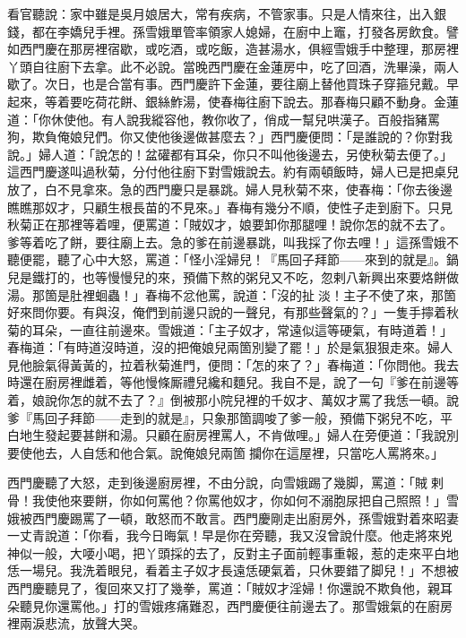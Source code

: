 看官聽說：家中雖是吳月娘居大，常有疾病，不管家事。只是人情來往，出入銀錢，都在李嬌兒手裡。孫雪娥單管率領家人媳婦，在廚中上竈，打發各房飲食。譬如西門慶在那房裡宿歇，或吃酒，或吃飯，造甚湯水，俱經雪娥手中整理，那房裡丫頭自往廚下去拿。此不必說。當晚西門慶在金蓮房中，吃了回酒，洗畢澡，兩人歇了。次日，也是合當有事。西門慶許下金蓮，要往廟上替他買珠子穿箍兒戴。早起來，等着要吃荷花餅、銀絲鮓湯，{}使春梅往廚下說去。那春梅只顧不動身。金蓮道：「你休使他。{}有人說我縱容他，教你收了，俏成一幫兒哄漢子。百般指豬罵狗，欺負俺娘兒們。你又使他後邊做甚麼去？」西門慶便問：「是誰說的？你對我說。」婦人道：「說怎的！盆礶都有耳朵，{}你只不叫他後邊去，另使秋菊去便了。」這西門慶遂叫過秋菊，分付他往廚下對雪娥說去。約有兩頓飯時，婦人已是把桌兒放了，{}白不見拿來。急的西門慶只是暴跳。婦人見秋菊不來，使春梅：「你去後邊瞧瞧那奴才，只顧生根長苗的不見來。」春梅有幾分不順，使性子走到廚下。只見秋菊正在那裡等着哩，便罵道：「賊奴才，娘要卸你那腿哩！說你怎的就不去了。爹等着吃了餅，要往廟上去。急的爹在前邊暴跳，叫我採了你去哩！」這孫雪娥不聽便罷，聽了心中大怒，罵道：「怪小淫婦兒！『馬回子拜節——來到的就是』。鍋兒是鐵打的，也等慢慢兒的來，預備下熬的粥兒又不吃，忽剌八新興出來要烙餅做湯。那箇是肚裡蛔蟲！」{}春梅不忿他罵，說道：「沒的扯𣭈淡！{}主子不使了來，那箇好來問你要。有與沒，俺們到前邊只說的一聲兒，有那些聲氣的？」一隻手擰着秋菊的耳朵，一直往前邊來。雪娥道：「主子奴才，常遠似這等硬氣，有時道着！」春梅道：「有時道沒時道，沒的把俺娘兒兩箇別變了罷！」於是氣狠狠走來。婦人見他臉氣得黃黃的，拉着秋菊進門，便問：「怎的來了？」春梅道：「你問他。我去時還在廚房裡雌着，等他慢條厮禮兒纔和麵兒。我自不是，說了一句『爹在前邊等着，娘說你怎的就不去了？』倒被那小院兒裡的{}千奴才、萬奴才罵了我恁一頓。說爹『馬回子拜節——走到的就是』，只象那箇調唆了爹一般，預備下粥兒不吃，平白地生發起要甚餅和湯。只顧在廚房裡罵人，不肯做哩。」婦人在旁便道：「我說別要使他去，{}人自恁和他合氣。說俺娘兒兩箇𢺞攔你在這屋裡，只當吃人罵將來。」

西門慶聽了大怒，走到後邊廚房裡，不由分說，向雪娥踢了幾脚，罵道：「賊𢱉剌骨！我使他來要餅，你如何罵他？你罵他奴才，你如何不溺胞尿把自己照照！」{}雪娥被西門慶踢罵了一頓，敢怒而不敢言。西門慶剛走出廚房外，孫雪娥對着來昭妻一丈青說道：「你看，我今日晦氣！早是你在旁聽，我又沒曾說什麼。他走將來兇神似一般，大喓小喝，把丫頭採的去了，反對主子面前輕事重報，惹的走來平白地恁一場兒。我洗着眼兒，看着主子奴才長遠恁硬氣着，只休要錯了脚兒！」不想被西門慶聽見了，復回來又打了幾拳，{}罵道：「賊奴才淫婦！你還說不欺負他，親耳朵聽見你還罵他。」打的雪娥疼痛難忍，西門慶便往前邊去了。那雪娥氣的在廚房裡兩淚悲流，放聲大哭。


